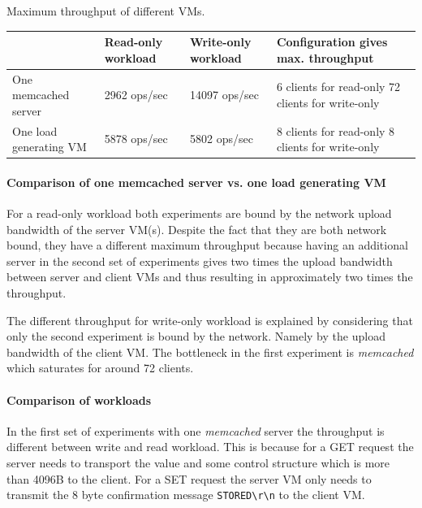 \documentclass[report.tex]{subfiles}
\begin{document}
\begin{center}
	{Maximum throughput of different VMs.}
	\begin{tabular}{|l|p{2cm}|p{2cm}|p{4cm}|}
		\hline                        & Read-only workload & Write-only workload & Configuration gives max. throughput \\ 
		\hline One memcached server   & 2962 ops/sec       & 14097 ops/sec & 6 clients for read-only 72 clients for write-only\\ 
		\hline One load generating VM & 5878 ops/sec       &  5802 ops/sec & 8 clients for read-only \hphantom{0} 8 clients for write-only\\ 
		\hline 
	\end{tabular}
\end{center}



\paragraph{Comparison of one memcached server vs. one load generating VM}
For a read-only workload both experiments are bound by the network upload bandwidth of the server VM(s).
Despite the fact that they are both network bound, they have a different maximum throughput because having an additional server in the second set of experiments gives two times the upload bandwidth between server and client VMs and thus resulting in approximately two times the throughput.

The different throughput for write-only workload is explained by considering that only the second experiment is bound by the network. Namely by the upload bandwidth of the client VM. The bottleneck in the first experiment is \emph{memcached} which saturates for around 72 clients.

\paragraph{Comparison of workloads}
In the first set of experiments with one \emph{memcached} server the throughput is different between write and read workload. This is because for a GET request the server needs to transport the value and some control structure which is more than 4096B to the client. For a SET request the server VM only needs to transmit the 8 byte confirmation message \texttt{STORED\textbackslash r\textbackslash n} to the client VM. 
\end{document}

